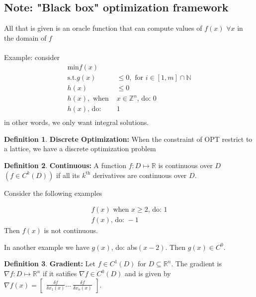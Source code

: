 \documentclass[titlepage]{article}
\theoremstyle{plain}
\theoremstyle{definition}
\newtheorem{defn}{Definition}[section]
\theoremstyle{remark}
\begin{document}
\subsection*{Note: "Black box" optimization framework}
All that is given is an oracle function that can compute values of $f(x)$ $\forall
x$ in the domain of $f$\\\\
Example: consider
\begin{align*}
\text{min} f(x)\\
\text{s.t.} g(x) &\leq 0, \text{ for } i \in [1,m] \cap \mathbb{N}\\
h(x) &\leq 0\\
h(x), \text{ when } &x \in \mathbb{Z}^n\text{, do: } 0\\
h(x)\text{, do: } &1\\
\end{align*}
in other words, we only want integral solutions.
\begin{defn}
\textbf{Discrete Optimization: } When the constraint of OPT restrict to a lattice,
we have a discrete optimization problem
\end{defn}
\begin{defn}
\textbf{Continuous: } A function $f: D\mapsto \mathbb{R}$ is continuous over $D$
$(f \in C^k(D))$ if all its $k^{\text{th}}$ derivatives are continuous over $D$.
\end{defn}
Consider the following examples

\begin{align*}
f(x) \text{ when } x \geq 2 \text{, do: } 1\\
f(x)\text{, do: } -1
\end{align*}
Then $f(x)$ is not continuous.

In another example we have $g(x)$, do: abs$(x - 2)$. Then $g(x) \in C^0$.

\begin{defn}
\textbf{Gradient: } Let $f \in C^1(D)$ for $D \subseteq \mathbb{R}^n$. The
gradient is $\nabla f: D \mapsto \mathbb{R}^n$ if it satifies $\nabla f \in
C^0(D)$ and is given by $\nabla f(x) = \left[ \begin{array}{cc} \frac{\delta
f}{\delta x_1(x)} \hdots \ \frac{\delta f}{ \delta x_n(x)} \end{array} \right]$.
\end{defn}
\end{document}

